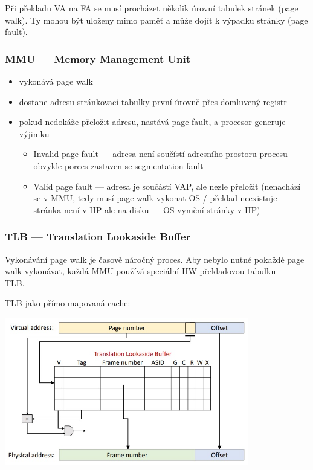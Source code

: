 Při překladu VA na FA se musí procházet několik úrovní tabulek stránek (page walk). Ty mohou být uloženy mimo paměť a může dojít k výpadku stránky (page fault).

\subsubsection*{MMU --- Memory Management Unit}
\begin{itemize}
	\item vykonává page walk
	\item dostane adresu stránkovací tabulky první úrovně přes domluvený registr
	\item pokud nedokáže přeložit adresu, nastává page fault, a procesor generuje výjimku
	\begin{itemize}
		\item Invalid page fault --- adresa není součístí adresního prostoru procesu --- obvykle porces zastaven se segmentation fault
		\item Valid page fault --- adresa je součástí VAP, ale nezle přeložit (nenachází se v MMU, tedy musí page walk vykonat OS / překlad neexistuje --- stránka není v HP ale na disku --- OS vymění stránky v HP)
	\end{itemize}
\end{itemize}

\subsubsection*{TLB --- Translation Lookaside Buffer}
Vykonávání page walk je časově náročný proces. Aby nebylo nutné pokaždé page walk vykonávat, každá MMU používá speciální HW překladovou tabulku --- TLB.

TLB jako přímo mapovaná cache:

\includegraphics[width=0.8\textwidth]{img/OB-6_3.jpg}

